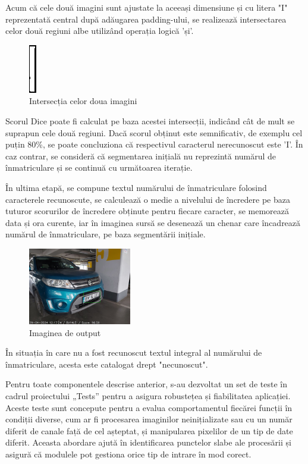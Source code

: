 \documentclass[a4paper,12pt]{report}
\begin{document}
Acum că cele două imagini sunt ajustate la aceeași dimensiune și cu litera "I" reprezentată central după adăugarea padding-ului, se realizează intersectarea celor două regiuni albe utilizând operația logică 'și'.

\begin{figure}[h!]
    \centering
    \includegraphics[height=0.2\textwidth]{images/intersection.jpg}
    \caption{Intersecția celor doua imagini}
\end{figure}
\FloatBarrier

Scorul Dice poate fi calculat pe baza acestei intersecții, indicând cât de mult se suprapun cele două regiuni. Dacă scorul obținut este semnificativ, de exemplu cel puțin 80\%, se poate concluziona că respectivul caracterul nerecunoscut este 'I'. În caz contrar, se consideră că segmentarea inițială nu reprezintă numărul de înmatriculare și se continuă cu următoarea iterație.

În ultima etapă, se compune textul numărului de înmatriculare folosind caracterele recunoscute, se calculează o medie a nivelului de încredere pe baza tuturor scorurilor de încredere obținute pentru fiecare caracter, se memorează data și ora curente, iar în imaginea sursă se desenează un chenar care încadrează numărul de înmatriculare, pe baza segmentării inițiale.

\begin{figure}[h!]
    \centering
    \includegraphics[width=0.4\textwidth]{images/output.jpg}
    \caption{Imaginea de output}
\end{figure}
\FloatBarrier

În situația în care nu a fost recunoscut textul integral al numărului de înmatriculare, acesta este catalogat drept "necunoscut".

Pentru toate componentele descrise anterior, s-au dezvoltat un set de teste în cadrul proiectului „Tests” pentru a asigura robustețea și fiabilitatea aplicației. Aceste teste sunt concepute pentru a evalua comportamentul fiecărei funcții în condiții diverse, cum ar fi procesarea imaginilor neinițializate sau cu un număr diferit de canale față de cel așteptat, și manipularea pixelilor de un tip de date diferit. Aceasta abordare ajută în identificarea punctelor slabe ale procesării și asigură că modulele pot gestiona orice tip de intrare în mod corect.
\end{document}
